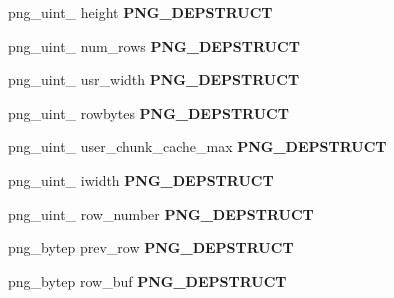 \begin{DoxyCompactItemize}
\item 
\hypertarget{structpng__struct__def_ad12711921edaad9cb500074b1542aac4}{png\-\_\-uint\-\_ height {\bfseries P\-N\-G\-\_\-\-D\-E\-P\-S\-T\-R\-U\-C\-T}}\label{structpng__struct__def_ad12711921edaad9cb500074b1542aac4}

\item 
\hypertarget{structpng__struct__def_a67a3a12d0d8e8cfbb11d5683b51df050}{png\-\_\-uint\-\_ num\-\_\-rows {\bfseries P\-N\-G\-\_\-\-D\-E\-P\-S\-T\-R\-U\-C\-T}}\label{structpng__struct__def_a67a3a12d0d8e8cfbb11d5683b51df050}

\item 
\hypertarget{structpng__struct__def_a2baaeace131d4c0c110310ce65749b83}{png\-\_\-uint\-\_ usr\-\_\-width {\bfseries P\-N\-G\-\_\-\-D\-E\-P\-S\-T\-R\-U\-C\-T}}\label{structpng__struct__def_a2baaeace131d4c0c110310ce65749b83}

\item 
\hypertarget{structpng__struct__def_ad804f4ef97eee630dd7cce4d098bc433}{png\-\_\-uint\-\_ rowbytes {\bfseries P\-N\-G\-\_\-\-D\-E\-P\-S\-T\-R\-U\-C\-T}}\label{structpng__struct__def_ad804f4ef97eee630dd7cce4d098bc433}

\item 
\hypertarget{structpng__struct__def_a5a4f409e7884ea875ac0ada356ac20d3}{png\-\_\-uint\-\_ user\-\_\-chunk\-\_\-cache\-\_\-max {\bfseries P\-N\-G\-\_\-\-D\-E\-P\-S\-T\-R\-U\-C\-T}}\label{structpng__struct__def_a5a4f409e7884ea875ac0ada356ac20d3}

\item 
\hypertarget{structpng__struct__def_a983dfd5a7f36c3306112e43b18ca314f}{png\-\_\-uint\-\_ iwidth {\bfseries P\-N\-G\-\_\-\-D\-E\-P\-S\-T\-R\-U\-C\-T}}\label{structpng__struct__def_a983dfd5a7f36c3306112e43b18ca314f}

\item 
\hypertarget{structpng__struct__def_a4c44f56eb680be3be254f835eb543f44}{png\-\_\-uint\-\_ row\-\_\-number {\bfseries P\-N\-G\-\_\-\-D\-E\-P\-S\-T\-R\-U\-C\-T}}\label{structpng__struct__def_a4c44f56eb680be3be254f835eb543f44}

\item 
\hypertarget{structpng__struct__def_aee3ed35a2a7271d7bcd4c215d4a4e47d}{png\-\_\-bytep prev\-\_\-row {\bfseries P\-N\-G\-\_\-\-D\-E\-P\-S\-T\-R\-U\-C\-T}}\label{structpng__struct__def_aee3ed35a2a7271d7bcd4c215d4a4e47d}

\item 
\hypertarget{structpng__struct__def_ab94e4fb0f3d3767af075972e03eaaff6}{png\-\_\-bytep row\-\_\-buf {\bfseries P\-N\-G\-\_\-\-D\-E\-P\-S\-T\-R\-U\-C\-T}}\label{structpng__struct__def_ab94e4fb0f3d3767af075972e03eaaff6}


\end{DoxyCompactItemize}
